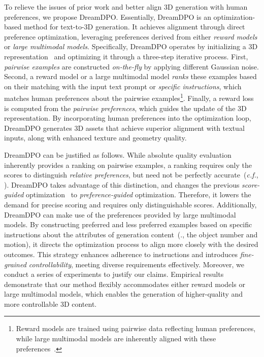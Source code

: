 To relieve the issues of prior work and better align 3D generation with human preferences, we propose DreamDPO. Essentially, DreamDPO is an optimization-based method for text-to-3D generation. It achieves alignment through direct preference optimization, leveraging preferences derived from either \textit{reward models} or \textit{large multimodal models}. Specifically, DreamDPO operates by initializing a 3D representation~\citep{mildenhall2020nerf,kerbl3Dgaussians} and optimizing it through a three-step iterative process. First, \textit{pairwise examples} are constructed \textit{on-the-fly} by applying different Gaussian noise. Second, a reward model or a large multimodal model \textit{ranks} these examples based on their matching with the input text prompt or \textit{specific instructions}, which matches human preferences about the pairwise examples\footnote{Reward models are trained using pairwise data reflecting human preferences, while large multimodal models are inherently aligned with these preferences~\citep{sun2023aligning}.}. Finally, a reward loss is computed from the \textit{pairwise preferences}, which guides the update of the 3D representation. By incorporating human preferences into the optimization loop, DreamDPO generates 3D assets that achieve superior alignment with textual inputs, along with enhanced texture and geometry quality.


DreamDPO can be justified as follows. While absolute quality evaluation inherently provides a ranking on pairwise examples, a ranking requires only the scores to distinguish \textit{relative preferences}, but need not be perfectly accurate~(\textit{c.f.}, \citep{zhang2024generating}). DreamDPO takes advantage of this distinction, and changes the previous \textit{score-guided} optimization~\citep{ye2025dreamreward} to \textit{preference-guided} optimization. Therefore, it lowers the demand for precise scoring and requires only distinguishable scores. Additionally, DreamDPO can make use of the preferences provided by large multimodal models. By constructing preferred and less preferred examples based on specific instructions about the attributes of generation content~(\eg., the object number and motion), it directs the optimization process to align more closely with the desired outcomes.  This strategy enhances adherence to instructions and introduces \textit{fine-grained controllability}, meeting diverse requirements effectively. Moreover, we conduct a series of experiments to justify our claims. Empirical results demonstrate that our method flexibly accommodates either reward models or large multimodal models, which enables the generation of higher-quality and more controllable 3D content. 

